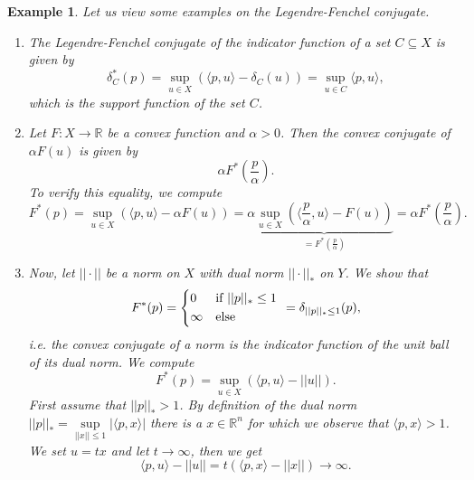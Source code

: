 \documentclass[abstracton]{scrreprt}
\newtheorem{example}[theorem]{Example}
\begin{document}
        \begin{example}
        \label{ex:legendre_fenchel_conjugate_example}
            Let us view some examples on the Legendre-Fenchel conjugate.
            \begin{enumerate}
                \item The Legendre-Fenchel conjugate of the indicator function of a set $C \subseteq X$ is given by
                    $$
                        \delta^{\ast}_{C}(p) = \sup_{u \in X} \left( \langle p, u \rangle - \delta_{C}(u) \right) = \sup_{u \in C} \langle p, u \rangle,
                    $$
                which is the support function of the set $C$.
                \item Let $F: X \to \mathbb{R}$ be a convex function and $\alpha > 0$. Then the convex conjugate of $\alpha F(u)$ is given by
                    $$
                        \alpha F^{\ast}(\frac{p}{\alpha}).
                    $$
                To verify this equality, we compute
                    $$
                        F^{\ast}(p) = \sup_{u \in X} \left( \langle p, u \rangle - \alpha F(u) \right) = \alpha \underbrace{\sup_{u \in X} \left( \langle \frac{p}{\alpha}, u \rangle - F(u) \right)}_{= F^{\ast}(\frac{p}{\alpha})} = \alpha F^{\ast}(\frac{p}{\alpha}).
                    $$
                \item Now, let $||\cdot||$ be a norm on $X$ with dual norm $||\cdot||_{\ast}$ on $Y$. We show that
                    $$
                        F^{\ast}(p) =
                            \begin{dcases*}
                                0 & \textnormal{if $||p||_{\ast} \le 1$} \\
                                \infty & \textnormal{else}
                            \end{dcases*}
                        = \delta_{||p||_{\ast} \le 1}(p),
                    $$
                i.e. the convex conjugate of a norm is the indicator function of the unit ball of its dual norm. We compute
                    $$
                        F^{\ast}(p) = \sup_{u \in X} \left( \langle p, u \rangle - ||u|| \right).
                    $$
                First assume that $||p||_{\ast} > 1$. By definition of the dual norm $||p||_{\ast} = \sup\limits_{||x|| \le 1} |\langle p, x \rangle|$ there is a $x \in \mathbb{R}^{n}$ for which we observe that $\langle p, x \rangle > 1$. We set $u = tx$ and let $t \longrightarrow \infty$, then we get
                    $$
                        \langle p, u \rangle - ||u|| = t(\langle p, x \rangle - ||x||) \longrightarrow \infty.
$$
\end{enumerate}
\end{example}
\end{document}
